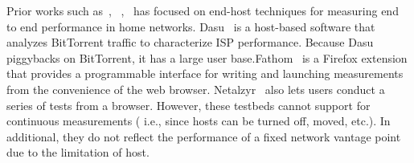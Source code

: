 Prior works such as~\cite{sanchez2014measurement},~\cite{dhawan2012fathom}
,~\cite{kreibich2010netalyzr} has focused on end-host techniques for 
measuring end to end performance in home networks. Dasu~\cite{
sanchez2014measurement} is a host-based software that analyzes BitTorrent 
traffic to characterize ISP performance. Because Dasu piggybacks on 
BitTorrent, it has a large user base.Fathom~\cite{dhawan2012fathom} is a 
Firefox extension that provides a programmable interface for writing and 
launching measurements from the convenience of the web browser. Netalzyr~\cite{kreibich2010netalyzr} also lets users conduct a series of tests from a 
browser. However, these testbeds cannot support for continuous measurements (
i.e., since hosts can be turned off, moved, etc.). In additional, they do 
not reflect the performance of a fixed network vantage point due to the 
limitation of host. 
